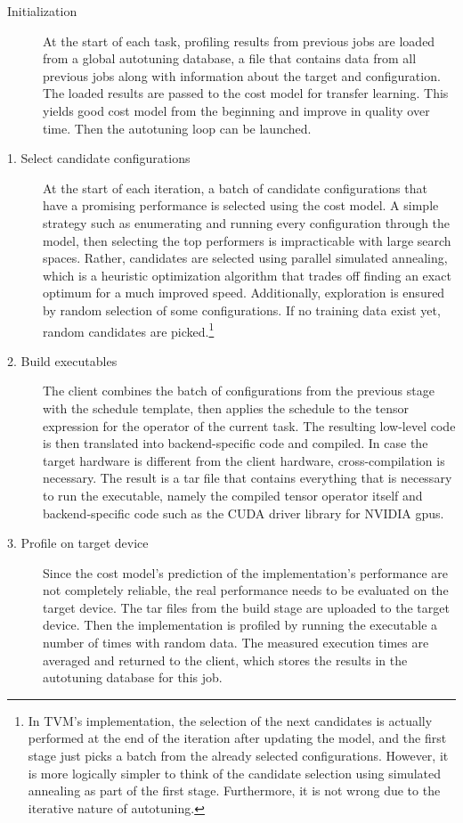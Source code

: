 \begin{description}
	\item[Initialization] At the start of each task, profiling results from previous jobs are loaded from a global autotuning database, a file that contains data from all previous jobs along with information about the target and configuration. The loaded results are passed to the cost model for transfer learning. This yields good cost model from the beginning and improve in quality over time. Then the autotuning loop can be launched.
	\item[1. Select candidate configurations] At the start of each iteration, a batch of candidate configurations that have a promising performance is selected using the cost model. A simple strategy such as enumerating and running every configuration through the model, then selecting the top performers is impracticable with large search spaces. Rather, candidates are selected using parallel simulated annealing, which is a heuristic optimization algorithm that trades off finding an exact optimum for a much improved speed. Additionally, exploration is ensured by random selection of some configurations. If no training data exist yet, random candidates are picked.\footnote{In TVM's implementation, the selection of the next candidates is actually performed at the end of the iteration after updating the model, and the first stage just picks a batch from the already selected configurations. However, it is more logically simpler to think of the candidate selection using simulated annealing as part of the first stage. Furthermore, it is not wrong due to the iterative nature of autotuning.}
	\item[2. Build executables] The client combines the batch of configurations from the previous stage with the schedule template, then applies the schedule to the tensor expression for the operator of the current task. The resulting low-level code is then translated into backend-specific code and compiled. In case the target hardware is different from the client hardware, cross-compilation is necessary. The result is a tar file that contains everything that is necessary to run the executable, namely the compiled tensor operator itself and backend-specific code such as the CUDA driver library for NVIDIA \glspl{gpu}.
	\item[3. Profile on target device] Since the cost model's prediction of the implementation's performance are not completely reliable, the real performance needs to be evaluated on the target device. The tar files from the build stage are uploaded to the target device. Then the implementation is profiled by running the executable a number of times with random data. The measured execution times are averaged and returned to the client, which stores the results in the autotuning database for this job.

\end{description}
